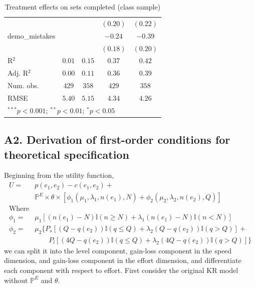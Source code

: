 \documentclass[
  12,
  letterpaper,
  DIV=11,
  numbers=noendperiod]{scrartcl}
\begin{document}
\begin{table}
{\begin{center}
\begin{tabular}{l c c c c}
                        &               &               & $(0.20)$      & $(0.22)$      \\
demo\_mistakes          &               &               & $-0.24$       & $-0.39$       \\
                        &               &               & $(0.18)$      & $(0.20)$      \\
\hline
R$^2$                   & $0.01$        & $0.15$        & $0.37$        & $0.42$        \\
Adj. R$^2$              & $0.00$        & $0.11$        & $0.36$        & $0.39$        \\
Num. obs.               & $429$         & $358$         & $429$         & $358$         \\
RMSE                    & $5.40$        & $5.15$        & $4.34$        & $4.26$        \\
\hline
\multicolumn{5}{l}{\scriptsize{$^{***}p<0.001$; $^{**}p<0.01$; $^{*}p<0.05$}}
\end{tabular}
\label{table:coefficients}
\end{center}

}

\caption{\label{tbl-reg-sets-class}Treatment effects on sets completed
(class sample)}

\end{table}%

\subsection{A2. Derivation of first-order conditions for theoretical
specification}\label{a2.-derivation-of-first-order-conditions-for-theoretical-specification}

Beginning from the utility function, \[
\begin{aligned}
U = & p(e_1, e_2) - c(e_1, e_2) + \nonumber \\
    & \mathbb{P}^E \times \theta \times [\phi_1(\mu_1, \lambda_1, n(e_1), N) + \phi_2(\mu_2, \lambda_2, n(e_2), Q)] \nonumber \\
\text{Where}
\\
\phi_1 = & \mu_1[(n(e_1)-N)\mathbb{I}(n \geq N) + \lambda_1(n(e_1)-N)\mathbb{I}(n<N)] \nonumber \\
\phi_2 = & \mu_2 \{P_s[(Q-q(e_2))\mathbb{I}(q \leq Q) + \lambda_2(Q-q(e_2))\mathbb{I}(q>Q)] + \nonumber \\
& \qquad P_l[(4Q-q(e_2))\mathbb{I}(q \leq Q) + \lambda_2(4Q-q(e_2))\mathbb{I}(q>Q)]\} 
\end{aligned}
\] we can split it into the level component, gain-loss component in the
speed dimension, and gain-loss component in the effort dimension, and
differentiate each component with respect to effort. First consider the
original KR model without \(\mathbb{P}^E\) and \(\theta\).
\end{document}
